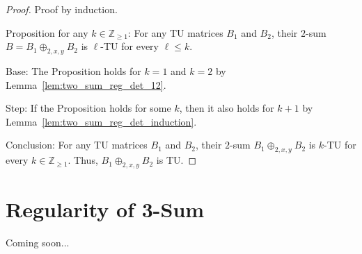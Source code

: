 \documentclass{article}
\theoremstyle{definition}
\begin{document}
\begin{proof}
    Proof by induction.

    Proposition for any $k \in \mathbb{Z}_{\geq 1}$: For any TU matrices $B_{1}$ and $B_{2}$, their $2$-sum $B = B_{1} \oplus_{2, x, y} B_{2}$ is $\ell$-TU for every $\ell \leq k$.

    Base: The Proposition holds for $k = 1$ and $k = 2$ by Lemma~\ref{lem:two_sum_reg_det_12}.

    Step: If the Proposition holds for some $k$, then it also holds for $k + 1$ by Lemma~\ref{lem:two_sum_reg_det_induction}.

    Conclusion: For any TU matrices $B_{1}$ and $B_{2}$, their $2$-sum $B_{1} \oplus_{2, x, y} B_{2}$ is $k$-TU for every $k \in \mathbb{Z}_{\geq 1}$. Thus, $B_{1} \oplus_{2, x, y} B_{2}$ is TU.
\end{proof}


\section{Regularity of 3-Sum}

Coming soon...
\end{document}

